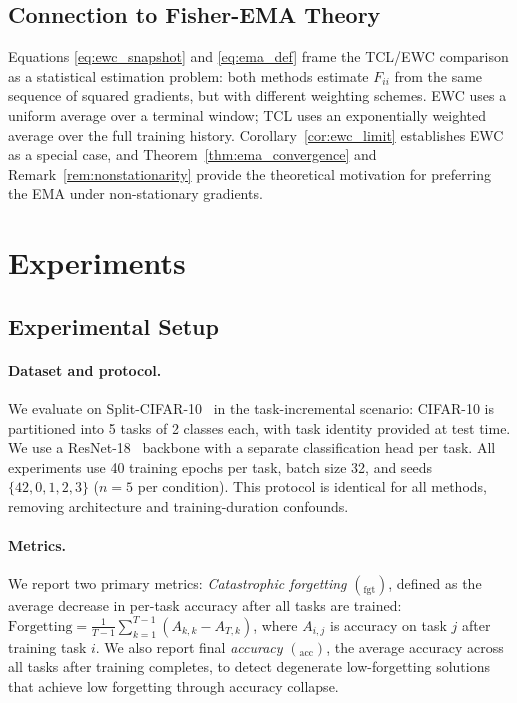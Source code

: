 \documentclass[10pt,letterpaper]{article}
\newcommand{\TCL}{\textsc{TCL}}
\newcommand{\EWC}{\textsc{EWC}}
\newcommand{\forgetmean}[1]{\ensuremath{#1_{\mathrm{fgt}}}}
\newcommand{\accmean}[1]{\ensuremath{#1_{\mathrm{acc}}}}
\begin{document}
\subsection{Connection to Fisher-EMA Theory}
\label{sec:theory_connection}

Equations \eqref{eq:ewc_snapshot} and \eqref{eq:ema_def} frame
the \TCL{}/\EWC{} comparison as a statistical estimation problem:
both methods estimate $F_{ii}$ from the same sequence of squared gradients,
but with different weighting schemes.
\EWC{} uses a uniform average over a terminal window;
\TCL{} uses an exponentially weighted average over the full training history.
Corollary~\ref{cor:ewc_limit} establishes \EWC{} as a special case,
and Theorem~\ref{thm:ema_convergence} and Remark~\ref{rem:nonstationarity}
provide the theoretical motivation for preferring the EMA under non-stationary
gradients.

\section{Experiments}
\label{sec:experiments}

\subsection{Experimental Setup}
\label{sec:setup}

\paragraph{Dataset and protocol.}
We evaluate on Split-CIFAR-10~\cite{Krizhevsky2009} in the
task-incremental scenario: CIFAR-10 is partitioned into 5 tasks of 2 classes
each, with task identity provided at test time.
We use a ResNet-18~\cite{He2016} backbone with a separate classification head per
task.
All experiments use 40 training epochs per task, batch size 32,
and seeds $\{42, 0, 1, 2, 3\}$ ($n{=}5$ per condition).
This protocol is identical for all methods, removing architecture and
training-duration confounds.

\paragraph{Metrics.}
We report two primary metrics:
\emph{Catastrophic forgetting} $(\forgetmean{})$, defined as the average decrease
in per-task accuracy after all tasks are trained:
$\text{Forgetting} = \frac{1}{T{-}1}\sum_{k=1}^{T-1}(A_{k,k} - A_{T,k})$,
where $A_{i,j}$ is accuracy on task $j$ after training task $i$.
We also report final \emph{accuracy} $(\accmean{})$, the average accuracy across
all tasks after training completes, to detect degenerate low-forgetting solutions
that achieve low forgetting through accuracy collapse.
\end{document}
